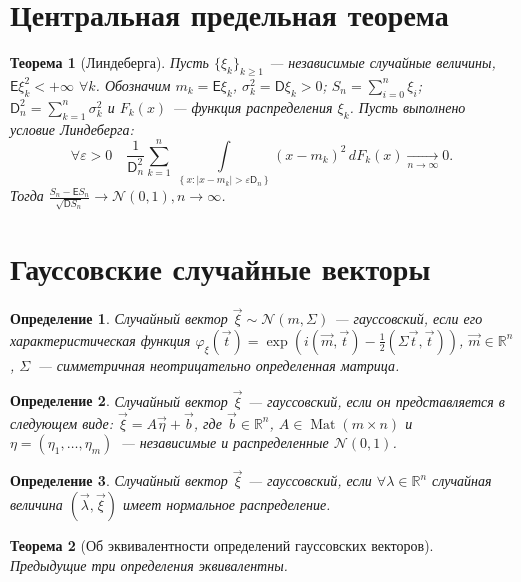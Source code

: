 \documentclass[11pt]{article}
\newtheorem{theorem}{Теорема}[section]
\newtheorem{definition}{Определение}
\DeclareMathOperator{\mat}{Mat}
\begin{document}
    \section[]{Центральная предельная теорема}
        \begin{theorem}[Линдеберга]
            Пусть $\{\xi_k\}_{k \geqslant 1}$ --- независимые случайные величины, $\mathsf{E} \xi_k^2 < + \infty$ $\forall k$. 
            Обозначим $m_k = \mathsf{E} \xi_k$, $\sigma_k^2 = \mathsf{D} \xi_k > 0$; $S_n = \sum_{i=0}^{n} \xi_i$; $\mathsf{D}_n^2 = \sum_{k=1}^{n} \sigma_k^2$ и $F_k(x)$ --- функция распределения $\xi_k$. 
            Пусть выполнено условие Линдеберга:
                $$ \forall \varepsilon > 0\quad \frac{1}{\mathsf{D}_n^2} \sum\limits_{k=1}^{n}\,\int\limits_{\left\{x : |x-m_k| > \varepsilon\mathsf{D}_n \right\}}{(x - m_k)^2 \,dF_k(x)} \xrightarrow[n \rightarrow \infty]{} 0. $$
            Тогда $\frac{S_n - \mathsf{E} S_n}{\sqrt{\mathsf{D} S_n}} \longrightarrow{} \mathcal{N}(0,1), n \rightarrow \infty$.
        \end{theorem}

    \section[]{Гауссовские случайные векторы}
        \begin{definition}
            Случайный вектор $\vec \xi \sim \mathcal{N}(m,\Sigma)$ --- гауссовский, если его характеристическая функция $\varphi_{\xi}(\vec t) = \exp{(i(\vec m, \vec t) - \frac{1}{2}(\Sigma \vec t, \vec t))}$, $\vec m \in \mathbb{R}^n$, $\Sigma$~--- симметричная неотрицательно определенная матрица.
        \end{definition}

        \begin{definition}
            Случайный вектор $\vec \xi$ --- гауссовский, если он представляется в следующем виде: $\vec \xi = A \vec \eta + \vec b$, где $\vec b \in \mathbb{R}^n$, $A \in \mat{(m \times n)}$ и $\eta = (\eta_1, \dots, \eta_m)$~--- независимые и распределенные $\mathcal{N}(0,1)$.
        \end{definition}
        
        \begin{definition}
            Случайный вектор $\vec \xi$ --- гауссовский, если $\forall\lambda \in \mathbb{R}^n$ случайная величина $(\vec \lambda, \vec \xi)$ имеет нормальное распределение.
        \end{definition}
        
        \begin{theorem}[Об эквивалентности определений гауссовских векторов]
            Предыдущие три определения эквивалентны.
        \end{theorem}
        
\end{document}

